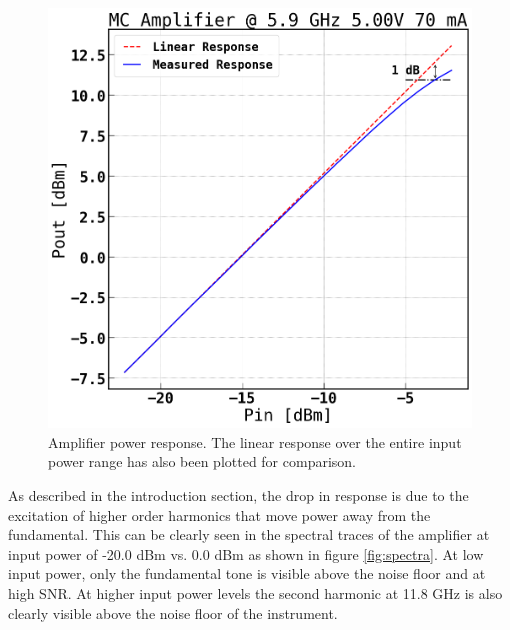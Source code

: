 \documentclass[twocolumn, aps, apl]{revtex4-1}
\begin{document}
\begin{figure}[!htbp]
    \centering
    \includegraphics[scale=0.35]{amp_power_compression.png}
    \caption{Amplifier power response. The linear response over the entire input power range has also been plotted for comparison.}
    \label{fig:ampcompress}
\end{figure}

As described in the introduction section, the drop in response is due to the excitation of higher order harmonics that move power away from the fundamental. This can be clearly seen in the spectral traces of the amplifier at input power of -20.0 dBm vs. 0.0 dBm as shown in figure \ref{fig:spectra}. At low input power, only the fundamental tone is visible above the noise floor and at high SNR. At higher input power levels the second harmonic at 11.8 GHz is also clearly visible above the noise floor of the instrument.
\end{document}
